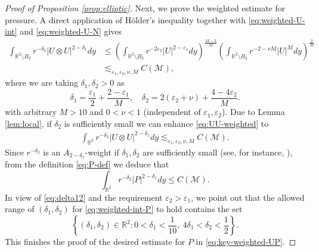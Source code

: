 \documentclass[12pt,reqno]{amsart}
\theoremstyle{plain}
\theoremstyle{definition}
\newcommand{\R}{\mathbb{R}}
\newcommand{\M}{\mathcal{M}}
\renewcommand{\:}{\colon}
\numberwithin{equation}{section}
\numberwithin{figure}{section}
\begin{document}
\begin{proof}[Proof of Proposition \ref{prop:elliptic}]
Next, we prove the weighted estimate for pressure. A direct application of H\"older's inequality together with \eqref{eq:weighted-U-int} and \eqref{eq:weighted-U-N} gives
\begin{align} \label{eq:UU-weighted}
    \int_{\R^2 \setminus B_2} r^{-\delta_2} |U \otimes U|^{2-\delta_1} dy &\le \left( \int_{\R^2 \setminus B_2} r^{-2\varepsilon_2} |U|^{2-\varepsilon_1}  dy \right)^\frac{M-2}{M} \left(\int_{\R^2 \setminus B_2} r^{-2-{\nu M}} |U|^M dy \right)^{\frac{2}{M}} \nonumber \\
    &\lesssim_{\varepsilon_1, \varepsilon_2, \nu, M} C(\M),    
\end{align}
where we are taking $\delta_1, \delta_2>0$ as
\begin{equation} \label{eq:delta12}
	\delta_1 = \frac{\varepsilon_1}{2} + \frac{ 2-\varepsilon_1 }{M}, \quad \delta_2 = 2(\varepsilon_2+\nu)+ \frac{ 4-4\varepsilon_2}{M}.
\end{equation}
with arbitrary $M>10$ and $0<\nu<1$ (independent of $\varepsilon_1, \varepsilon_2$). Due to Lemma \ref{lem:local}, if $\delta_2$ is sufficiently small we can enhance  \eqref{eq:UU-weighted} to
\begin{eqnarray}
	 \int_{\R^2} r^{-\delta_2} |U \otimes U|^{2-\delta_1} dy \lesssim_{\varepsilon_1, \varepsilon_2, \nu, M} C(\M).
\end{eqnarray}
Since $r^{-\delta_2}$ is an $A_{2-\delta_1}$-weight if $\delta_1, \delta_2$ are sufficiently small (see, for instance, \cite[Example 7.1.7]{GrafakosBook}), from the definition \eqref{eq:P-def} we deduce that
\begin{equation} \label{eq:weighted-int-P}
     \int_{\R^2} r^{-\delta_2} |P|^{2-\delta_1} dy \le C(\M).
\end{equation}
In view of \eqref{eq:delta12} and the requirement $\varepsilon_2>\varepsilon_1$, we point out that the allowed range of $(\delta_1, \delta_2)$ for \eqref{eq:weighted-int-P} to hold contains the set 
\begin{equation}
    \left\{(\delta_1, \delta_2) \in \R^2 : 0<\delta_1<\frac{1}{10}, \  4 \delta_1 <\delta_2<\frac12\right\}.
\end{equation}
This finishes the proof of the desired estimate for $P$ in \eqref{eq:key-weighted-UP}.

    
\end{proof}
\end{document}
